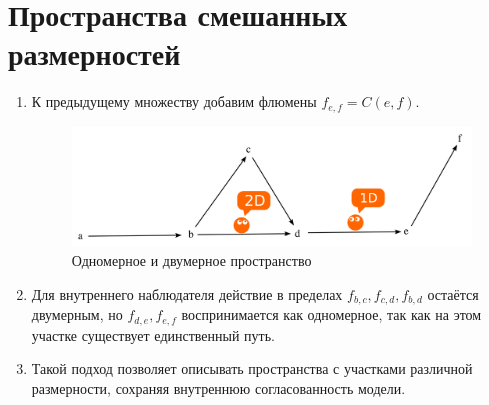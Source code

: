 \documentclass[final]{article}
\begin{document}
    \section{Пространства смешанных размерностей}
        \begin{enumerate}

            \item К предыдущему множеству добавим флюмены \( f_{e,f}=C(e,f) \).

            \begin{figure}[H]
                \centering
                \includegraphics[width=\textwidth]{./2d-f1f2f3f4f5.png}
                \caption{Одномерное и двумерное пространство }
                \label{fig:image}
            \end{figure}

            \item Для внутреннего наблюдателя действие в пределах \( 
            f_{b,c},f_{c,d},f_{b,d} \) остаётся двумерным, но \( f_{d,e},f_{e,f} \) 
            воспринимается как одномерное, так как на этом участке существует 
            единственный путь.

            \item Такой подход позволяет описывать пространства с участками 
            различной размерности, сохраняя внутреннюю согласованность модели.

        \end{enumerate}
\end{document}
